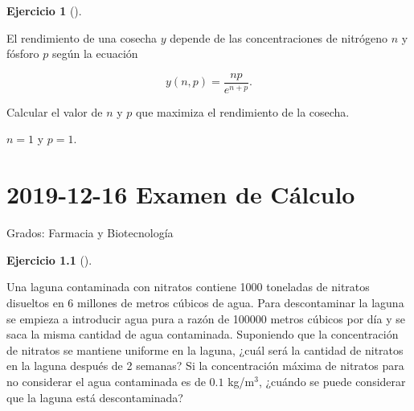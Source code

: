 \documentclass[
  a4paper,
]{scrreport}
\theoremstyle{definition}
\newtheorem{exercise}{Ejercicio}[chapter]
\theoremstyle{remark}
\begin{document}
\begin{exercise}[]\protect\hypertarget{exr-4}{}\label{exr-4}

El rendimiento de una cosecha \(y\) depende de las concentraciones de
nitrógeno \(n\) y fósforo \(p\) según la ecuación

\[
y(n,p)=\frac{np}{e^{n+p}}.
\]

Calcular el valor de \(n\) y \(p\) que maximiza el rendimiento de la
cosecha.

\end{exercise}

\begin{tcolorbox}[enhanced jigsaw, opacitybacktitle=0.6, titlerule=0mm, bottomtitle=1mm, toptitle=1mm, breakable, bottomrule=.15mm, left=2mm, opacityback=0, toprule=.15mm, leftrule=.75mm, colframe=quarto-callout-tip-color-frame, coltitle=black, rightrule=.15mm, colback=white, title=\textcolor{quarto-callout-tip-color}{\faLightbulb}\hspace{0.5em}{Solución}, arc=.35mm, colbacktitle=quarto-callout-tip-color!10!white]

\(n=1\) y \(p=1\).

\end{tcolorbox}


\chapter{\texorpdfstring{2019-12-16 Examen de
Cálculo}{2019-12-16  Examen de Cálculo}}\label{examen-de-cuxe1lculo-5}

Grados: Farmacia y Biotecnología

\begin{exercise}[]\protect\hypertarget{exr-1}{}\label{exr-1}

Una laguna contaminada con nitratos contiene 1000 toneladas de nitratos
disueltos en 6 millones de metros cúbicos de agua. Para descontaminar la
laguna se empieza a introducir agua pura a razón de 100000 metros
cúbicos por día y se saca la misma cantidad de agua contaminada.
Suponiendo que la concentración de nitratos se mantiene uniforme en la
laguna, ¿cuál será la cantidad de nitratos en la laguna después de 2
semanas? Si la concentración máxima de nitratos para no considerar el
agua contaminada es de \(0.1\) kg/m\(^3\), ¿cuándo se puede considerar
que la laguna está descontaminada?

\end{exercise}
\end{document}
